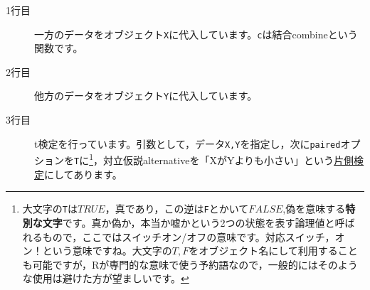 \begin{description}
	\item[1行目] 一方のデータをオブジェクト\texttt{X}に代入しています。\texttt{c}は結合combineという関数です。
	\item[2行目] 他方のデータをオブジェクト\texttt{Y}に代入しています。
	\item[3行目] t検定を行っています。引数として，データ\texttt{X,Y}を指定し，次に\texttt{paired}オプションを\texttt{T}に\footnote{大文字の\texttt{T}は$TRUE$，真であり，この逆は\texttt{F}とかいて$FALSE$,偽を意味する\textbf{特別な文字}です。真か偽か，本当か嘘かという2つの状態を表す論理値と呼ばれるもので，ここではスイッチオン/オフの意味です。対応スイッチ，オン！という意味ですね。大文字の$T,F$をオブジェクト名にして利用することも可能ですが，Rが専門的な意味で使う予約語なので，一般的にはそのような使用は避けた方が望ましいです。}，対立仮説alternativeを「XがYよりも小さい」という\underline{片側検定}にしてあります。
\end{description}
